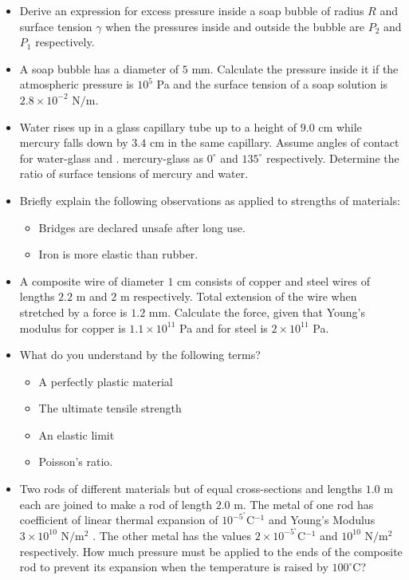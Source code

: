 \documentclass{article}
\begin{document}
\begin{itemize}
\item Derive an expression for excess pressure inside a soap bubble of radius $ R$ and surface tension $ \gamma $ when the pressures inside and outside the bubble are $ P_{2}$ and $ P_{1}$ respectively. 
\item A soap bubble has a diameter of $ 5$ mm. Calculate the pressure inside it if the atmospheric pressure is $ 10^{5}$ Pa and the surface tension of a soap solution is $ 2.8 \times 10^{-2}$ N$/$m.
\item Water rises up in a glass capillary tube up to a height of $ 9.0$ cm while mercury falls down by $ 3.4$ cm in the same capillary. Assume angles of contact for water-glass and . mercury-glass as $ 0^{\circ}$ and $ 135^{\circ}$ respectively. Determine the ratio of surface tensions of mercury and water. 
\item Briefly explain the following observations as applied to strengths of materials:
 \begin{itemize}
\item Bridges are declared unsafe after long use. 
\item Iron is more elastic than rubber. 
\end{itemize}
\item A composite wire of diameter $ 1$ cm consists of copper and steel wires of lengths $ 2.2$ m and $ 2$ m respectively. Total extension of the wire when stretched by a force is $ 1.2$ mm. Calculate the force, given that Young’s modulus for copper is $ 1.1 \times 10^{11}$ Pa and for steel is $ 2 \times 10^{11}$ Pa. 
\item What do you understand by the following terms?
 \begin{itemize}
\item A perfectly plastic material 
\item The ultimate tensile strength 
\item An elastic limit 
\item Poisson’s ratio. 
\end{itemize}
\item Two rods of different materials but of equal cross-sections and lengths $ 1.0$ m each are joined to make a rod of length $ 2.0$ m. The metal of one rod has coefficient of linear thermal expansion of $ 10^{-5}^{\circ}$C$ ^{-1}$ and Young’s Modulus $ 3 \times 10^{10}$ N$/$m$ ^{2}$ . The other metal has the values $ 2 \times 10^{-5}^{\circ}$C$ ^{-1}$ and $ 10^{10}$ N$/$m$ ^{2}$ respectively. How much pressure must be applied to the ends of the composite rod to prevent its expansion when the temperature is raised by $ 100^{\circ}$C? 

\end{itemize}
\end{document}

